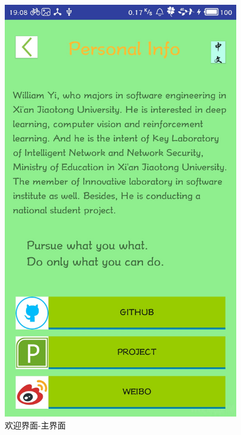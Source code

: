 \documentclass[UTF8, Microsoft YaHei]{book}
\begin{document}
\begin{figure}[!htb]
\begin{minipage}[c]{0.5\textwidth}
    \includegraphics[width=0.92\textwidth]{img/PersonalInfo.png}
    \end{minipage}
    \caption{欢迎界面-主界面}
    \end{figure}
\end{document}
